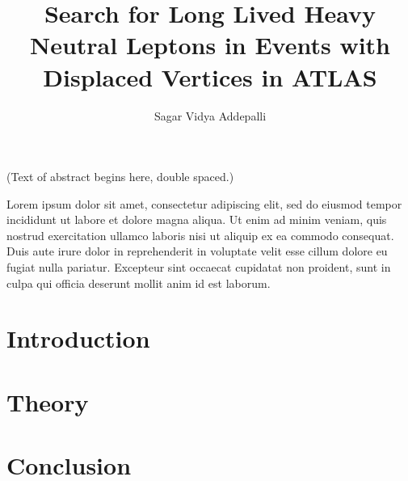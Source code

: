\documentclass{brandeis-dissertation3.12}
\title{Search for Long Lived Heavy Neutral Leptons in Events with Displaced Vertices in ATLAS }
\author{Sagar Vidya Addepalli}
\begin{document}
\maketitlepage
\makeapproval


\begin{dissertation-abstract}
(Text of abstract begins here, double spaced.) 

Lorem ipsum dolor sit amet, consectetur adipiscing elit, sed do eiusmod tempor incididunt ut labore et dolore magna aliqua. Ut enim ad minim veniam, quis nostrud exercitation ullamco laboris nisi ut aliquip ex ea commodo consequat. Duis aute irure dolor in reprehenderit in voluptate velit esse cillum dolore eu fugiat nulla pariatur. Excepteur sint occaecat cupidatat non proident, sunt in culpa qui officia deserunt mollit anim id est laborum.
\end{dissertation-abstract}

\doublespacing

\tableofcontents

\clearpage

\listoftables

\startbody

\chapter{Introduction}
\label{chap:intro}


\chapter{Theory}
\label{chap:theory}


\chapter{Conclusion}
\label{chap:conclusion}




\end{document}
